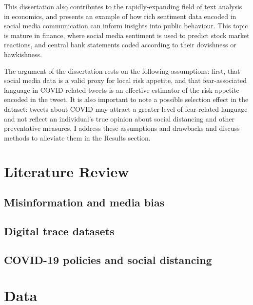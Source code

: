 \documentclass{article}
\begin{document}
This dissertation also contributes to the rapidly-expanding field of text analysis in economics, and presents an example of how rich sentiment data encoded in social media communication can inform insights into public behaviour. This topic is mature in finance, where social media sentiment is used to predict stock market reactions, and central bank statements coded according to their dovishness or hawkishness. 

The argument of the dissertation rests on the following assumptions: first, that social media data is a valid proxy for local risk appetite, and that fear-associated language in COVID-related tweets is an effective estimator of the risk appetite encoded in the tweet. It is also important to note a possible selection effect in the dataset: tweets about COVID may attract a greater level of fear-related language and not reflect an individual's true opinion about social distancing and other preventative measures. I address these assumptions and drawbacks and discuss methods to alleviate them in the Results section.

\section{Literature Review}
\subsection{Misinformation and media bias}
\subsection{Digital trace datasets}
\subsection{COVID-19 policies and social distancing}

\section{Data}

\end{document}
